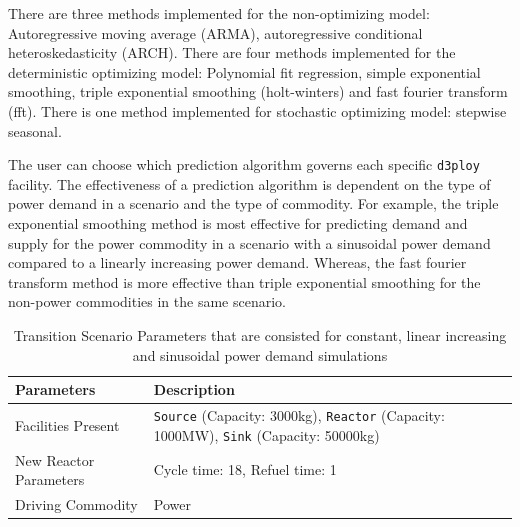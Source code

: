 \documentclass{anstrans}
\newcommand{\deploy}{\texttt{d3ploy}\xspace}%
\begin{document}
There are three methods implemented for the non-optimizing model: 
Autoregressive moving average (ARMA), autoregressive 
conditional heteroskedasticity (ARCH).
There are four methods implemented for the deterministic optimizing model: 
Polynomial fit regression, simple exponential smoothing,  
triple exponential smoothing (holt-winters) and fast fourier 
transform (fft). 
There is one method implemented for stochastic optimizing model: 
stepwise seasonal.  

The user can choose which prediction algorithm governs each specific 
\deploy facility. 
The effectiveness of a prediction algorithm is dependent on the type 
of power demand in a scenario and the type of commodity. 
For example, the triple exponential smoothing method is most effective
for predicting demand and supply for the power commodity in a scenario  
with a sinusoidal power demand compared to a linearly increasing power 
demand.
Whereas, the fast fourier transform method is more effective than triple 
exponential smoothing for the non-power commodities in the same 
scenario.  

\begin{table}[htb]
    \centering
    \caption {Transition Scenario Parameters that are consisted for constant, linear increasing and sinusoidal power demand simulations}
	\label{tab:transition-scenario-all}
    \begin{tabular}{|l|p{4.5cm}|}
    \hline
    \textbf{Parameters}    & \textbf{Description} \\ \hline
    Facilities Present     & \texttt{Source} (Capacity: 3000kg), \texttt{Reactor} (Capacity: 1000MW), \texttt{Sink} (Capacity: 50000kg)      \\ \hline
    New Reactor Parameters & Cycle time: 18, Refuel time: 1\\ \hline
    Driving Commodity & Power \\ \hline
    \end{tabular}
\end{table}
\end{document}

